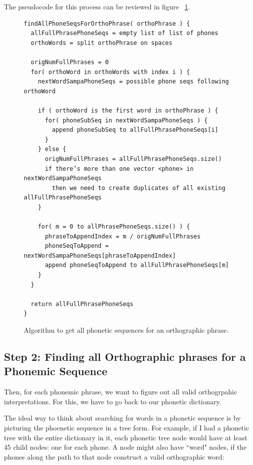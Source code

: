The pseudocode for this process can be reviewed in figure ~\ref{fig:psuedoCode:findAllPhoneSeqsForOrthoPhrase}.

\setlength\LTleft{-2in}
\begin{figure}
\begin{verbatim}
findAllPhoneSeqsForOrthoPhrase( orthoPhrase ) {
  allFullPhrasePhoneSeqs = empty list of list of phones
  orthoWords = split orthoPhrase on spaces
  
  origNumFullPhrases = 0
  for( orthoWord in orthoWords with index i ) {
    nextWordSampaPhoneSeqs = possible phone seqs following orthoWord
    
    if ( orthoWord is the first word in orthoPhrase ) {
      for( phoneSubSeq in nextWordSampaPhoneSeqs ) {
        append phoneSubSeq to allFullPhrasePhoneSeqs[i]
      }
    } else {
      origNumFullPhrases = allFullPhrasePhoneSeqs.size()
      if there’s more than one vector <phone> in nextWordSampaPhoneSeqs
        then we need to create duplicates of all existing allFullPhrasePhoneSeqs
    }
    
    for( m = 0 to allPhrasePhoneSeqs.size() ) {
      phraseToAppendIndex = m / origNumFullPhrases
      phoneSeqToAppend = nextWordSampaPhoneSeqs[phraseToAppendIndex]
      append phoneSeqToAppend to allFullPhrasePhoneSeqs[m]
    }
  }

  return allFullPhrasePhoneSeqs
}
\end{verbatim}
\captionfonts
\caption[Pseudocode for findAllPhoneSeqsForOrthoPhrase]{ Algorithm to get all phonetic sequences for an orthographic phrase. }
\label{fig:psuedoCode:findAllPhoneSeqsForOrthoPhrase}
\end{figure}



\subsection{Step 2: Finding all Orthographic phrases for a Phonemic Sequence}
\label{subsection:stepTwoFindOrthoforSAMPA}

Then, for each phonemic phrase, we want to figure out all valid orthogrpahic interpretations.  For this, we have to go back to our phonetic dictionary.

The ideal way to think about searching for words in a phonetic sequence is by picturing the phoenetic sequence in a tree form.  For example, if I had a phonetic tree with the entire dictionary in it, each phonetic tree node would have at least 45 child nodes: one for each phone.  A node might also have ``word" nodes, if the phones along the path to that node construct a valid orthographic word:


